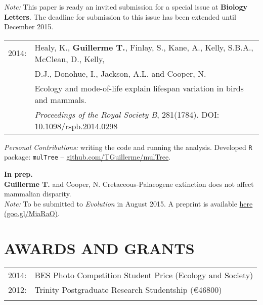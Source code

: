 \documentclass[10pt,a4paper]{article}
\begin{document}
{\textit{Note:} This paper is ready an invited submission for a special issue at \textbf{Biology Letters}. The deadline for submission to this issue has been extended until December 2015.
\bigskip


\begin{tabular}{ll}
2014: & Healy, K., \textbf{Guillerme T.}, Finlay, S., Kane, A., Kelly, S.B.A., McClean, D., Kelly, \\
& D.J., Donohue, I., Jackson, A.L. and Cooper, N. \\
& Ecology and mode-of-life explain lifespan variation in birds and mammals.\\
& \textit{Proceedings of the Royal Society B}, 281(1784). DOI: 10.1098/rspb.2014.0298\\ %
\end{tabular}

\textit{Personal Contributions:} writing the code and running the analysis. Developed \texttt{R} package: \texttt{mulTree} -- \href{https://github.com/TGuillerme/mulTree}{github.com/TGuillerme/mulTree}.
\bigskip

\raggedright\textbf{In prep.}\\[1.5ex]
\textbf{Guillerme T.} and Cooper, N. Cretaceous-Palaeogene extinction does not affect mammalian disparity. \\
\smallskip
\textit{Note:} To be submitted to \textit{Evolution} in August 2015. A preprint is available \href{https://goo.gl/MiaRaO}{here (goo.gl/MiaRaO)}. \\ 
\bigskip


\section{AWARDS AND GRANTS}
\begin{tabular}{ll}
2014: & BES Photo Competition Student Price (Ecology and Society)\\
2012: & Trinity Postgraduate Research Studentship (\euro46800)\\
& \\ 
\end{tabular}
\bigskip

}
\end{document}
